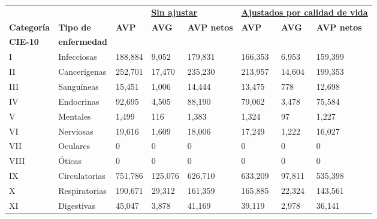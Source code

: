 
\begin{tabular}{ll @{\hskip 0.5in}lll@{\hskip 0.5in} lll}
\toprule[1.5 pt]
&  & \multicolumn{3}{c}{{\ul\textbf{Sin ajustar}}}   & \multicolumn{3}{c}{{\ul \textbf{Ajustados por calidad de vida}}} \\
\textbf{Categoría} & \textbf{Tipo de} & \textbf{AVP} & \textbf{AVG} & \textbf{AVP netos} & \textbf{AVP}       & \textbf{AVG}      & \textbf{AVP netos}      \\
\textbf{CIE-10}& \textbf{enfermedad} & & &\textbf{} & & & \textbf{}\\
\midrule
I                      & Infecciosas      & 188,884      & 9,052              & 179,831            & 166,353           & 6,953                   & 159,399 \\
II                     & Cancerígenas     & 252,701      & 17,470             & 235,230            & 213,957           & 14,604                  & 199,353 \\
III                    & Sanguíneas       & 15,451       & 1,006              & 14,444             & 13,475            & 778                     & 12,698  \\
IV                     & Endocrinas       & 92,695       & 4,505              & 88,190             & 79,062            & 3,478                   & 75,584  \\
V                      & Mentales         & 1,499        & 116                & 1,383              & 1,324             & 97                      & 1,227   \\
VI                     & Nerviosas        & 19,616       & 1,609              & 18,006             & 17,249            & 1,222                   & 16,027  \\
VII                    & Oculares         & 0            & 0                  & 0                  & 0                 & 0                       & 0       \\
VIII                   & Óticas           & 0            & 0                  & 0                  & 0                 & 0                       & 0       \\
IX                     & Circulatorias    & 751,786      & 125,076            & 626,710            & 633,209           & 97,811                  & 535,398 \\
X                      & Respiratorias    & 190,671      & 29,312             & 161,359            & 165,885           & 22,324                  & 143,561 \\
XI                     & Digestivas       & 45,047       & 3,878              & 41,169             & 39,119            & 2,978                   & 36,141  \\

\end{tabular}
